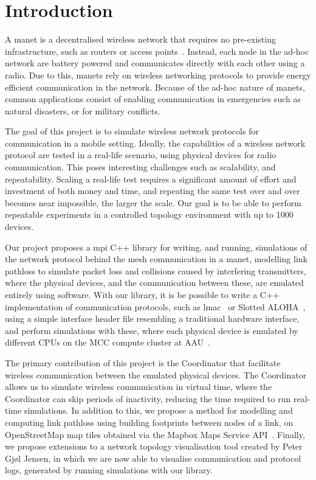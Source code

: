 \chapter{Introduction}\label{ch:introduction}
A \gls{manet} is a decentralised wireless network that requires no pre-existing infrastructure, such as
routers or access points~\cite{inproceedings:routingsurvery}. Instead, each node in the ad-hoc network are
battery powered and communicates directly with each other using a radio. Due to this, \gls{manet}s rely on
wireless networking protocols to provide energy efficient communication in the network. Because of the ad-hoc
nature of \gls{manet}s, common applications consist of enabling communication in emergencies such as
natural disasters, or for military conflicts.\smallbreak

The goal of this project is to simulate wireless network protocols for communication in a mobile setting.
Ideally, the capabilities of a wireless network protocol are tested in a real-life scenario, using physical
devices for radio communication. This poses interesting challenges such as scalability, and repeatability.
Scaling a real-life test requires a significant amount of effort and investment of both money and time, and
repeating the same test over and over becomes near impossible, the larger the scale. Our goal is to be able to
perform repeatable experiments in a controlled topology environment with up to 1000 devices.\smallbreak

Our project proposes a \gls{mpi} C++ library for writing, and running, simulations of the network protocol
behind the mesh communication in a \gls{manet}, modelling link \gls{pathloss} to simulate packet loss and
collisions caused by interfering transmitters, where the physical devices, and the communication between
these, are emulated entirely using software. With our library, it is be possible to write a C++ implementation
of communication protocols, such as \gls{lmac}~\cite{paper:lmac_protocol} or Slotted
ALOHA~\cite{Roberts:1975:APS:1024916.1024920}, using a simple interface header file resembling a traditional
hardware interface, and perform simulations with these, where each physical device is emulated by different
CPUs on the MCC compute cluster at AAU~\cite{website:mccaau}. \smallbreak

The primary contribution of this project is the Coordinator that facilitate wireless communication between the
emulated physical devices. The Coordinator allows us to simulate wireless communication in virtual time, where
the Coordinator can skip periods of inactivity, reducing the time required to run real-time
simulations. In addition to this, we propose a method for modelling and computing link \gls{pathloss} using
building footprints between nodes of a link, on OpenStreetMap map tiles obtained via the Mapbox Maps Service
API~\cite{website:mapbox}. Finally, we propose extensions to a network topology visualisation tool created by
Peter Gjøl Jensen, in which we are now able to visualise communication and protocol logs, generated by running
simulations with our library.

